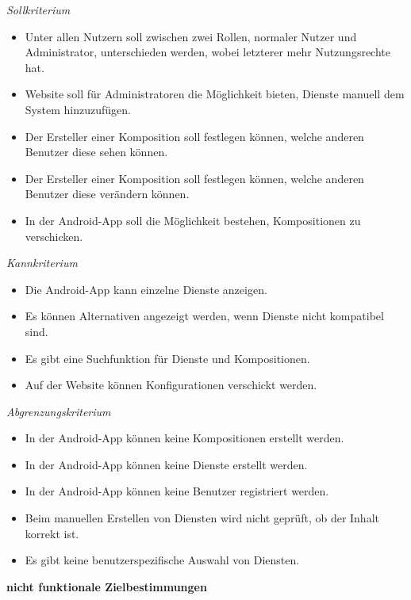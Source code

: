 \textit{Sollkriterium}

\begin{itemize}[leftmargin=4pc]
	\item Unter allen Nutzern soll zwischen zwei Rollen, normaler Nutzer und Administrator, unterschieden werden, wobei letzterer mehr Nutzungsrechte hat.
	\item Website soll für Administratoren die Möglichkeit bieten, Dienste manuell dem System hinzuzufügen.
	\item Der Ersteller einer Komposition soll festlegen können, welche anderen Benutzer diese sehen können.
	\item Der Ersteller einer Komposition soll festlegen können, welche anderen Benutzer diese verändern können.
	\item In der Android-App soll die Möglichkeit bestehen, Kompositionen zu verschicken.
\end{itemize}

\textit{Kannkriterium}

\begin{itemize}[leftmargin=4pc]
	\item Die Android-App kann einzelne Dienste anzeigen.
	\item Es können Alternativen angezeigt werden, wenn Dienste nicht kompatibel sind.
	\item Es gibt eine Suchfunktion für Dienste und Kompositionen.
	\item Auf der Website können Konfigurationen verschickt werden.
\end{itemize}

\textit{Abgrenzungskriterium}

\begin{itemize}[leftmargin=4pc]
	\item In der Android-App können keine Kompositionen erstellt werden.
	\item In der Android-App können keine Dienste erstellt werden.
	\item In der Android-App können keine Benutzer registriert werden.
	\item Beim manuellen Erstellen von Diensten wird nicht geprüft, ob der Inhalt korrekt ist.
	\item Es gibt keine benutzerspezifische Auswahl von Diensten.\\
\end{itemize}


\textbf{nicht funktionale Zielbestimmungen}\newline

